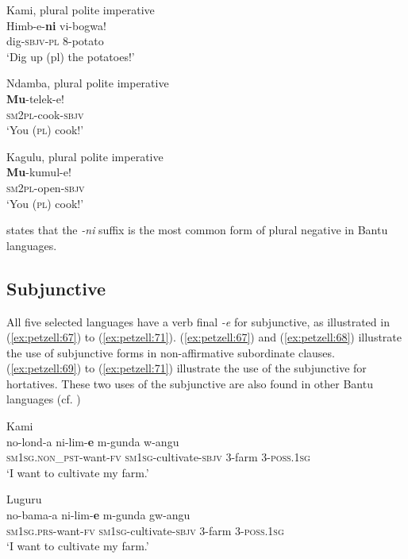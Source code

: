 \documentclass[output=paper,
            colorlinks, citecolor=brown
            ,draftmode
		  ]{langscibook}
\begin{document}
\ea\label{ex:petzell:64}Kami, plural polite imperative\\
\gll Himb-e-\textbf{ni}    vi-bogwa!  \\
dig-\textsc{sbjv}{}-\textsc{{pl}}   8-potato\\
\glt `Dig up (pl) the potatoes!'


\ex\label{ex:petzell:65}Ndamba, plural polite imperative\\
\gll \textbf{Mu}{}-telek-e! \\
\textsc{sm}{2}\textsc{pl}{}-cook-\textsc{sbjv}\\
\glt `You (\textsc{pl}) cook!'


\ex\label{ex:petzell:66}Kagulu, plural polite imperative\\
\gll \textbf{Mu}{}-kumul-e!  \\
\textsc{sm}{2}\textsc{pl}{}-open-\textsc{sbjv}\\
\glt `You (\textsc{pl}) cook!'
\z


{\citet[39]{Nurse2008} states that the \textit{{}-ni} suffix is the most common form of plural negative in Bantu languages.}


\subsection{Subjunctive}\label{sec:petzell:4.2}

All five selected languages have a verb final \textit{{}-e} for subjunctive, as illustrated in (\ref{ex:petzell:67}) to (\ref{ex:petzell:71}).  (\ref{ex:petzell:67}) and (\ref{ex:petzell:68}) illustrate the use of subjunctive forms in non-affirmative subordinate clauses.  (\ref{ex:petzell:69}) to (\ref{ex:petzell:71}) illustrate the use of the subjunctive for hortatives. These two uses of the subjunctive are also found in other Bantu languages (cf. \citealt{NurseDevos2019})


\ea\label{ex:petzell:67}Kami\\
\gll no-lond-a             ni-lim-\textbf{e}          m-gunda     w-angu\\
\textsc{sm}1\textsc{sg}.\textsc{non\_pst}{}-want-\textsc{fv}  \textsc{sm}1\textsc{sg}{}-cultivate-\textsc{{sbjv}}  3-farm     3-\textsc{poss.1sg}\\
\glt `I want to cultivate my farm.'


\ex\label{ex:petzell:68}Luguru\\
\gll no-bama-a           ni-lim-\textbf{{e}}             m-gunda     gw-angu \\
\textsc{sm}1\textsc{sg}.\textsc{prs}{}-want-\textsc{fv}    \textsc{sm}1\textsc{sg}{}-cultivate-\textsc{{sbjv}}    3-farm     3-\textsc{poss.1sg}\\
\glt `I want to cultivate my farm.'
\end{document}
